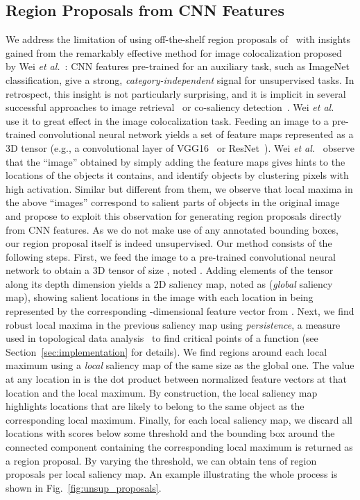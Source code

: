 \documentclass[runningheads]{llncs}
\begin{document}
\subsection{Region Proposals from CNN Features}
\label{sec:unsup_region_proposals}
We address the limitation of using off-the-shelf region proposals of~\cite{Vo2019UnsupOptim} with insights gained from the remarkably effective method for image colocalization proposed by Wei {\em et al.}~\cite{Wei2019ddtplus}: CNN features pre-trained for an auxiliary task, such as ImageNet classification, give a strong, {\em   category-independent} signal for unsupervised tasks. In retrospect, this insight is not particularly surprising, and it is implicit in several successful approaches to image retrieval~\cite{zhang2015self_pace} or co-saliency detection~\cite{Babenko2014neuralcode,Babenko2015sumaggregate,Hsu2018cosaliency,Wei2017scda}. Wei {\em et  al.}~\cite{Wei2019ddtplus} use it to great effect in the image colocalization task. Feeding an image to a pre-trained convolutional neural network yields a set of feature maps represented as a 3D tensor (e.g., a convolutional layer of VGG16~\cite{Symonian2014verydeep} or ResNet~\cite{He16}). Wei {\em et al.}~\cite{Wei2019ddtplus} observe that the ``image'' obtained by simply adding the feature maps gives hints to the locations of the objects it contains, and identify objects by clustering pixels with high activation. Similar but different from them, we observe that local maxima in the above ``images'' correspond to salient parts of objects in the original image and propose to exploit this observation for generating region proposals directly from CNN features. As we do not make use of any annotated bounding boxes, our region proposal itself is indeed unsupervised. Our method consists of the following steps. First, we feed the image to a pre-trained convolutional neural network to obtain a 3D tensor of size , noted . Adding elements of the tensor along its depth dimension yields a  2D saliency map, noted as  (\textit{global} saliency map), showing salient locations in the image with each location in  being represented by the corresponding -dimensional feature vector from . Next, we find robust local maxima in the previous saliency map using \textit{persistence}, a measure used in topological data analysis~\cite{Chazal2013persistence,Edelsbrunner2009introtopo,Edelsbrunner2002topo,Oudot2015persistence,Zomorodian2005compute} to find critical points of a function (see Section~\ref{sec:implementation} for details). We find regions around each local maximum  using a \textit{local} saliency map  of the same size as the global one. The value at any location in  is the dot product between normalized feature vectors at that location and the local maximum. By construction, the local saliency map highlights locations that are likely to belong to the same object as the corresponding local maximum. Finally, for each local saliency map, we discard all locations with scores below some threshold and the bounding box around the connected component containing the corresponding local maximum is returned as a region proposal. By varying the threshold, we can obtain tens of region proposals per local saliency map. An example illustrating the whole process is shown in Fig.~\ref{fig:unsup_proposals}.
\end{document}
